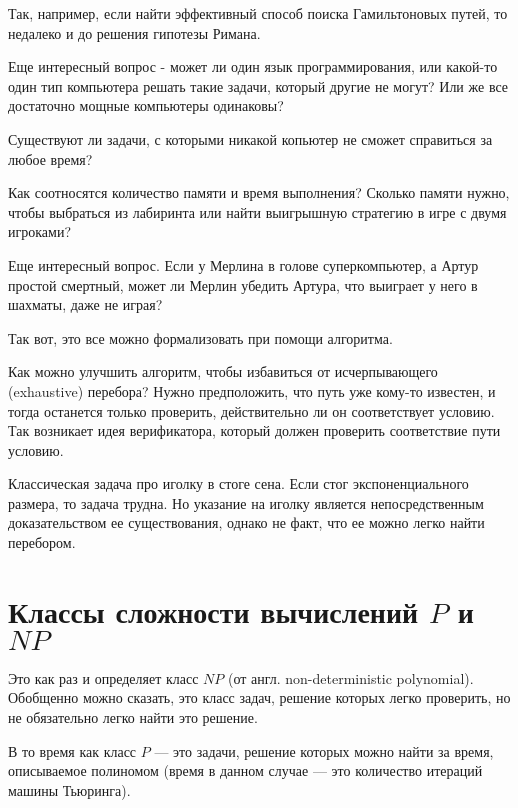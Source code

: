 \documentclass{article}
\begin{document}
Так, например, если найти эффективный способ поиска Гамильтоновых путей, то недалеко и до решения гипотезы Римана.

Еще интересный вопрос - может ли один язык программирования, или какой-то один тип компьютера решать такие задачи, который другие не могут? Или же все достаточно мощные компьютеры одинаковы? 

Существуют ли задачи, с которыми никакой копьютер не сможет справиться за любое время?

Как соотносятся количество памяти и время выполнения? Сколько памяти нужно, чтобы выбраться из лабиринта или найти выигрышную стратегию в игре с двумя игроками?

Еще интересный вопрос. Если у Мерлина в голове суперкомпьютер, а Артур простой смертный, может ли Мерлин убедить Артура, что выиграет у него в шахматы, даже не играя?

Так вот, это все можно формализовать при помощи алгоритма.


Как можно улучшить алгоритм, чтобы избавиться от исчерпывающего (exhaustive) перебора? Нужно предположить, что путь уже кому-то известен, и тогда останется только проверить, действительно ли он соответствует условию. Так возникает идея верификатора, который должен проверить соответствие пути условию.

Классическая задача про иголку в стоге сена. Если стог экспоненциального размера, то задача трудна.  
Но указание на иголку является непосредственным доказательством ее существования, однако не факт, что ее можно легко найти перебором. 


\section{Классы сложности вычислений $P$ и $NP$}

Это как раз и определяет класс $NP$ (от англ. non-deterministic polynomial). Обобщенно можно сказать, это класс задач, решение которых легко проверить, но не обязательно легко найти это решение.

В то время как класс $P$ --- это задачи, решение которых можно найти за время, описываемое полиномом (время в данном случае --- это количество итераций машины Тьюринга).
\end{document}
